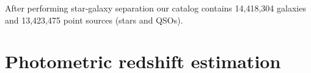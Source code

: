 \documentclass[apj,iop]{emulateapj}
\begin{document}

After performing star-galaxy separation our catalog contains 14,418,304 galaxies and 13,423,475 point sources (stars and QSOs).


\section{Photometric redshift estimation}


\end{document}
